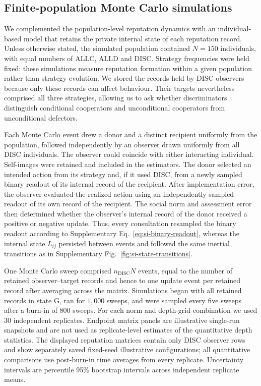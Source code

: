 \documentclass[fleqn,10pt]{wlscirep}
\begin{document}
\subsection*{Finite-population Monte Carlo simulations}
\label{sec:methods-finite-monte-carlo}

We complemented the population-level reputation dynamics with an individual-based model that retains the private internal state of each reputation record. Unless otherwise stated, the simulated population contained $N=150$ individuals, with equal numbers of $\mathrm{ALLC}$, $\mathrm{ALLD}$ and $\mathrm{DISC}$. Strategy frequencies were held fixed: these simulations measure reputation formation within a given population rather than strategy evolution. We stored the records held by $\mathrm{DISC}$ observers because only these records can affect behaviour. Their targets nevertheless comprised all three strategies, allowing us to ask whether discriminators distinguish conditional cooperators and unconditional cooperators from unconditional defectors.

Each Monte Carlo event drew a donor and a distinct recipient uniformly from the population, followed independently by an observer drawn uniformly from all $\mathrm{DISC}$ individuals. The observer could coincide with either interacting individual. Self-images were retained and included in the estimators. The donor selected an intended action from its strategy and, if it used $\mathrm{DISC}$, from a newly sampled binary readout of its internal record of the recipient. After implementation error, the observer evaluated the realized action using an independently sampled readout of its own record of the recipient. The social norm and assessment error then determined whether the observer's internal record of the donor received a positive or negative
update. Thus, every consultation resampled the binary readout according to Supplementary Eq.~\eqref{eq:si-binary-readout}, whereas the internal state $L_{ij}$ persisted between events and followed the same inertial transitions as in Supplementary Fig.~\ref{fig:si-state-transitions}.

One Monte Carlo sweep comprised $n_{\mathrm{DISC}}N$ events, equal to the number of retained observer--target records and hence to one update event per retained record after averaging across the matrix. Simulations began with all retained records in state $\mathrm{G}$, ran for $1{,}000$ sweeps, and were sampled every five sweeps after a burn-in of $800$ sweeps. For each norm and depth-grid combination we used 30 independent replicates. Endpoint matrix panels are illustrative single-run snapshots and are not used as replicate-level estimates of the quantitative depth statistics. The displayed reputation matrices contain only $\mathrm{DISC}$ observer rows and show separately saved fixed-seed illustrative configurations; all quantitative comparisons use post-burn-in time
averages from every replicate. Uncertainty intervals are percentile 95\% bootstrap intervals across independent replicate means.
\end{document}
